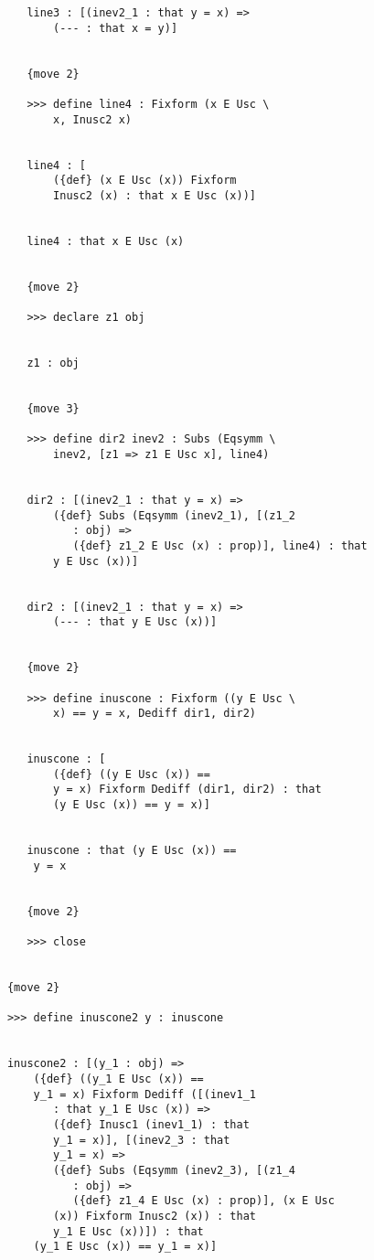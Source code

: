 \documentclass[12pt]{article}
\begin{document}
\begin{verbatim}
         line3 : [(inev2_1 : that y = x) => 
             (--- : that x = y)]


         {move 2}

         >>> define line4 : Fixform (x E Usc \
             x, Inusc2 x)


         line4 : [
             ({def} (x E Usc (x)) Fixform 
             Inusc2 (x) : that x E Usc (x))]


         line4 : that x E Usc (x)


         {move 2}

         >>> declare z1 obj


         z1 : obj


         {move 3}

         >>> define dir2 inev2 : Subs (Eqsymm \
             inev2, [z1 => z1 E Usc x], line4)


         dir2 : [(inev2_1 : that y = x) => 
             ({def} Subs (Eqsymm (inev2_1), [(z1_2 
                : obj) => 
                ({def} z1_2 E Usc (x) : prop)], line4) : that 
             y E Usc (x))]


         dir2 : [(inev2_1 : that y = x) => 
             (--- : that y E Usc (x))]


         {move 2}

         >>> define inuscone : Fixform ((y E Usc \
             x) == y = x, Dediff dir1, dir2)


         inuscone : [
             ({def} ((y E Usc (x)) == 
             y = x) Fixform Dediff (dir1, dir2) : that 
             (y E Usc (x)) == y = x)]


         inuscone : that (y E Usc (x)) == 
          y = x


         {move 2}

         >>> close


      {move 2}

      >>> define inuscone2 y : inuscone


      inuscone2 : [(y_1 : obj) => 
          ({def} ((y_1 E Usc (x)) == 
          y_1 = x) Fixform Dediff ([(inev1_1 
             : that y_1 E Usc (x)) => 
             ({def} Inusc1 (inev1_1) : that 
             y_1 = x)], [(inev2_3 : that 
             y_1 = x) => 
             ({def} Subs (Eqsymm (inev2_3), [(z1_4 
                : obj) => 
                ({def} z1_4 E Usc (x) : prop)], (x E Usc 
             (x)) Fixform Inusc2 (x)) : that 
             y_1 E Usc (x))]) : that 
          (y_1 E Usc (x)) == y_1 = x)]



\end{verbatim}
\end{document}
